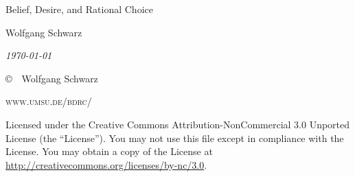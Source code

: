 \documentclass{../wobook2017}
\begin{document}
\begingroup
\thispagestyle{empty}

\begin{center}


{\huge Belief, Desire, and Rational Choice\par}

\vspace{10mm}

{\Large Wolfgang Schwarz}

\vspace{10mm}

{\normalsize \textit{\today}}

\end{center}

\vfill
\endgroup
{
\small

\noindent \copyright\ \the\year\ Wolfgang Schwarz

\noindent \textsc{www.umsu.de/bdrc/}

\noindent Licensed under the Creative Commons Attribution-NonCommercial 3.0 Unported License (the ``License''). You may not use this file except in compliance with the License. You may obtain a copy of the License at \url{http://creativecommons.org/licenses/by-nc/3.0}.
}


\tableofcontents 


\end{document}
